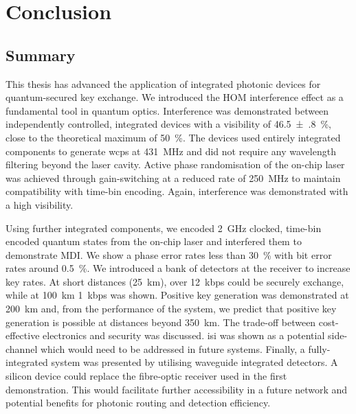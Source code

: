 %
%
\graphicspath{{./chapters/chapter07/fig07/}}

\let\textcircled=\pgftextcircled
\chapter{Conclusion}
\label{chap:conclusion}



\section{Summary}

This thesis has advanced the application of integrated photonic devices for quantum-secured key exchange. We introduced the \ac{HOM} interference effect as a fundamental tool in quantum optics. Interference was demonstrated between independently controlled, integrated devices with a visibility of \SI{46.5(8)}{\percent}, close to the theoretical maximum of \SI{50}{\percent}. The devices used entirely integrated components to generate \acp{wcp} at \SI{431}{MHz} and did not require any wavelength filtering beyond the laser cavity. Active phase randomisation of the on-chip laser was achieved through gain-switching at a reduced rate of \SI{250}{MHz} to maintain compatibility with time-bin encoding. Again, interference was demonstrated with a high visibility.

Using further integrated components, we encoded \SI{2}{GHz} clocked, time-bin encoded quantum states from the on-chip laser and interfered them to demonstrate \ac{MDI}. We show a phase error rates less than \SI{30}{\percent} with bit error rates around \SI{0.5}{\percent}. We introduced a bank of detectors at the receiver to increase key rates. At short distances (\SI{25}{km}), over \SI{12}{kbps} could be securely exchange, while at \SI{100}{km} \SI{1}{kbps} was shown. Positive key generation was demonstrated at \SI{200}{km} and, from the performance of the system, we predict that positive key generation is possible at distances beyond \SI{350}{km}. The trade-off between cost-effective electronics and security was discussed. \Ac{isi} was shown as a potential side-channel which would need to be addressed in future systems. Finally, a fully-integrated system was presented by utilising waveguide integrated detectors. A silicon device could replace the fibre-optic receiver used in the first demonstration. This would facilitate further accessibility in a future network and potential benefits for photonic routing and detection efficiency. 

